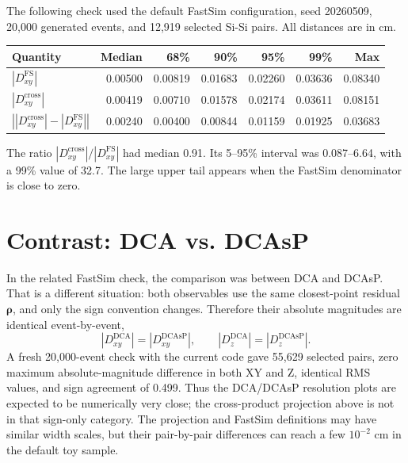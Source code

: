 \documentclass[10pt]{article}
\begin{document}
The following check used the default FastSim configuration, seed 20260509,
20,000 generated events, and 12,919 selected Si-Si pairs. All distances are
in cm.

\begin{center}
\begin{tabular}{lrrrrrr}
\toprule
Quantity & Median & 68\% & 90\% & 95\% & 99\% & Max \\
\midrule
$|D^{\mathrm{FS}}_{xy}|$       & 0.00500 & 0.00819 & 0.01683 & 0.02260 & 0.03636 & 0.08340 \\
$|D^{\mathrm{cross}}_{xy}|$    & 0.00419 & 0.00710 & 0.01578 & 0.02174 & 0.03611 & 0.08151 \\
$\left||D^{\mathrm{cross}}_{xy}|-|D^{\mathrm{FS}}_{xy}|\right|$
                                  & 0.00240 & 0.00400 & 0.00844 & 0.01159 & 0.01925 & 0.03683 \\
\bottomrule
\end{tabular}
\end{center}

The ratio $|D^{\mathrm{cross}}_{xy}|/|D^{\mathrm{FS}}_{xy}|$ had median 0.91.
Its 5--95\% interval was 0.087--6.64, with a 99\% value of 32.7. The large
upper tail appears when the FastSim denominator is close to zero.

\section*{Contrast: DCA vs. DCAsP}

In the related FastSim check, the comparison was between DCA and DCAsP. That is
a different situation: both observables use the same closest-point residual
$\boldsymbol{\rho}$, and only the sign convention changes. Therefore their
absolute magnitudes are identical event-by-event,
\[
  |D^{\mathrm{DCA}}_{xy}| = |D^{\mathrm{DCAsP}}_{xy}|,\qquad
  |D^{\mathrm{DCA}}_{z}| = |D^{\mathrm{DCAsP}}_{z}|.
\]
A fresh 20,000-event check with the current code gave 55,629 selected pairs,
zero maximum absolute-magnitude difference in both XY and Z, identical RMS
values, and sign agreement of 0.499. Thus the DCA/DCAsP resolution plots are
expected to be numerically very close; the cross-product projection above is
not in that sign-only category. The projection and FastSim definitions may have
similar width scales, but their pair-by-pair differences can reach a few
$10^{-2}$ cm in the default toy sample.
\end{document}
